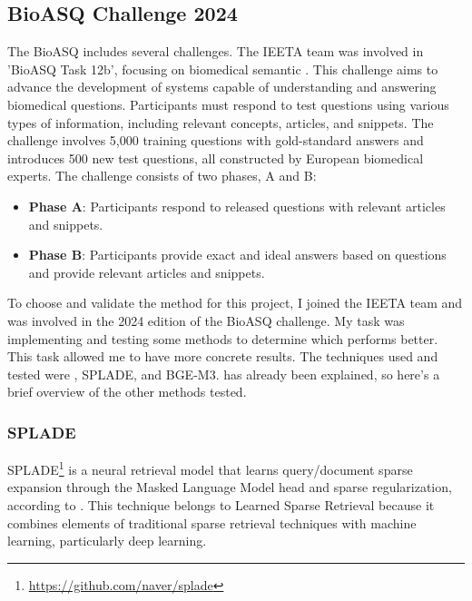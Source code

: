 \subsection{BioASQ Challenge 2024}
\label{bioasq}

The BioASQ includes several challenges. The IEETA team was involved in 'BioASQ Task 12b', focusing on biomedical semantic {\qa}. This challenge aims to advance the development of systems capable of understanding and answering biomedical questions. Participants must respond to test questions using various types of information, including relevant concepts, articles, and snippets. The challenge involves 5,000 training questions with gold-standard answers and introduces 500 new test questions, all constructed by European biomedical experts. The challenge consists of two phases, A and B:

\begin{itemize}
    \item \textbf{Phase A}: Participants respond to released questions with relevant articles and snippets.
    \item \textbf{Phase B}: Participants provide exact and ideal answers based on questions and provide relevant articles and snippets.
\end{itemize}

To choose and validate the {\ir} method for this project, I joined the IEETA team and was involved in the 2024 edition of the BioASQ challenge. My task was implementing and testing some {\ir} methods to determine which performs better. This task allowed me to have more concrete results. The techniques used and tested were {\bm}, SPLADE\cite{formal_splade_2021}, and BGE-M3\cite{chen_bge_2024}. {\bm} has already been explained, so here's a brief overview of the other methods tested.


\subsubsection{SPLADE} 

SPLADE\footnote{\url{https://github.com/naver/splade}} is a neural retrieval model that learns query/document sparse expansion through the {\bert} Masked Language Model head and sparse regularization, according to \citet{formal_splade_2021} . This technique belongs to Learned Sparse Retrieval because it combines elements of traditional sparse retrieval techniques with machine learning, particularly deep learning. 

